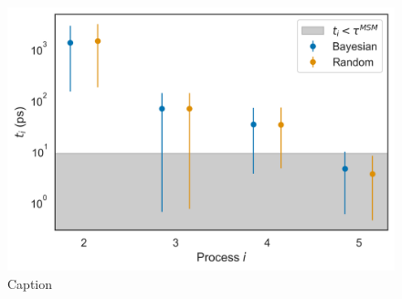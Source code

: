 \begin{figure}
    \centering
    \includegraphics[width=0.8\linewidth]{chapters/msm_optimization/figures/ala1_opt_comparison.png}
    \caption{Caption}
    \label{fig:ala1_best_msm_ts}
\end{figure}



